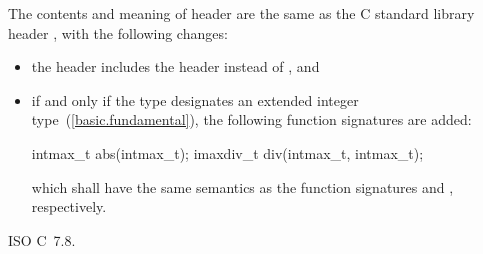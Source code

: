 \pnum
{}%
%
The contents and meaning of header 
are the same as the C standard library header ,
with the following changes:

\begin{itemize}
\item
the header  includes the header  instead
of , and

\item
if and only if the type  designates an extended integer 
type~(\ref{basic.fundamental}), the following function signatures are added:
\begin{codeblock}
intmax_t abs(intmax_t);
imaxdiv_t div(intmax_t, intmax_t);
\end{codeblock}
which shall have the same semantics as the function signatures
 and
, respectively.
\end{itemize}

\xref ISO C~7.8.
